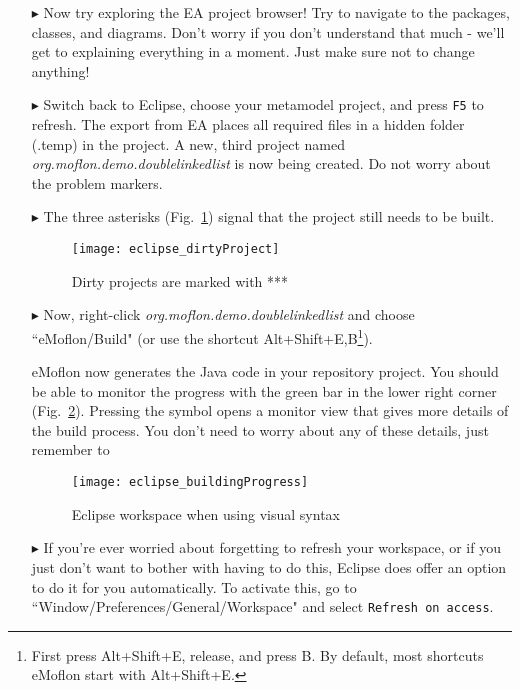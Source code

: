 \begin{itemize}
\item[$\blacktriangleright$] Now try exploring the EA project browser! Try to navigate to the packages, classes, and diagrams. Don't worry if you don't
understand that much - we'll get to explaining everything in a moment. Just make sure not to change anything!

\item[$\blacktriangleright$] Switch back to Eclipse, choose your metamodel project, and press \texttt{F5} to refresh. 
The export from EA places all required files in a hidden folder (.temp) in the project.
A new, third project named \emph{org.moflon.demo.doublelinkedlist} is now being created.
Do not worry about the problem markers.

\item[$\blacktriangleright$] The three asterisks (Fig.~\ref{eclipse:dirty-project}) signal that the project still needs to be built.

\vspace{0.5cm}

\begin{figure}[htbp]
    \centering
    \texttt{[image: eclipse\_dirtyProject]}
    \caption{Dirty projects are marked with ***} 
    \label{eclipse:dirty-project} 
\end{figure}

\vspace{0.5cm}

\item[$\blacktriangleright$] Now, right-click \emph{org.moflon.demo.doublelinkedlist} and choose ``eMoflon/Build" (or use the shortcut Alt+Shift+E,B\footnote{First press Alt+Shift+E, release, and press B.
By default, most shortcuts eMoflon start with Alt+Shift+E.}).

eMoflon now generates the Java code in your repository project.
You should be able to monitor the progress with the green bar in the lower right corner (Fig.~\ref{eclipse:build}). Pressing the
symbol opens a monitor view that gives more details of the build process. You don't need to worry about any of these details, just remember to 

\begin{figure}[htbp]
    \centering
    \texttt{[image: eclipse\_buildingProgress]}
    \caption{Eclipse workspace when using visual syntax} 
    \label{eclipse:build} 
\end{figure}

\item[$\blacktriangleright$] If you're ever worried about forgetting to refresh your workspace, or if you just don't want to bother with having to do this,
Eclipse does offer an option to do it for you automatically. To activate this, go to ``Window/Preferences/General/Workspace" and select \texttt{Refresh on
access}.

\end{itemize}